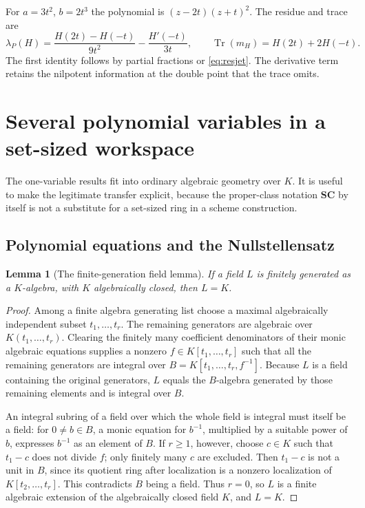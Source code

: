 \documentclass[11pt,letterpaper]{article}
\numberwithin{equation}{section}
\newtheorem{lemma}[theorem]{Lemma}
\theoremstyle{definition}
\theoremstyle{remark}\newtheorem{remark}[theorem]{Remark}
\newcommand{\SC}{\mathbf{SC}}
\newcommand{\Tr}{\operatorname{Tr}}
\begin{document}
For $a=3t^2$, $b=2t^3$ the polynomial is
$(z-2t)(z+t)^2$. The residue and trace are
\[
 \lambda_P(H)=\frac{H(2t)-H(-t)}{9t^2}-\frac{H'(-t)}{3t},\qquad
 \Tr(m_H)=H(2t)+2H(-t).
\]
The first identity follows by partial fractions or \eqref{eq:resjet}.
The derivative term retains the nilpotent information at the double
point that the trace omits.

\section{Several polynomial variables in a set-sized workspace}\label{sec:multivariate}
The one-variable results fit into ordinary algebraic geometry over $K$.
It is useful to make the legitimate transfer explicit, because the
proper-class notation $\SC$ by itself is not a substitute for a
set-sized ring in a scheme construction.

\subsection{Polynomial equations and the Nullstellensatz}
\begin{lemma}[The finite-generation field lemma]\label{lem:zariski}
If a field $L$ is finitely generated as a $K$-algebra, with $K$
algebraically closed, then $L=K$.
\end{lemma}
\begin{proof}
Among a finite algebra generating list choose a maximal algebraically
independent subset $t_1,\ldots,t_r$. The remaining generators are
algebraic over $K(t_1,\ldots,t_r)$. Clearing the finitely many
coefficient denominators of their monic algebraic equations supplies
a nonzero $f\in K[t_1,\ldots,t_r]$ such that all the remaining
generators are integral over
$B=K[t_1,\ldots,t_r,f^{-1}]$. Because $L$ is a field containing the
original generators, $L$ equals the $B$-algebra generated by those
remaining elements and is integral over $B$.

An integral subring of a field over which the whole field is integral
must itself be a field: for $0\ne b\in B$, a monic equation for
$b^{-1}$, multiplied by a suitable power of $b$, expresses $b^{-1}$
as an element of $B$. If $r\ge1$, however, choose $c\in K$ such that
$t_1-c$ does not divide $f$; only finitely many $c$ are excluded.
Then $t_1-c$ is not a unit in $B$, since its quotient ring after
localization is a nonzero localization of $K[t_2,\ldots,t_r]$.
This contradicts $B$ being a field. Thus $r=0$, so $L$ is a finite
algebraic extension of the algebraically closed field $K$, and $L=K$.
\end{proof}
\end{document}
